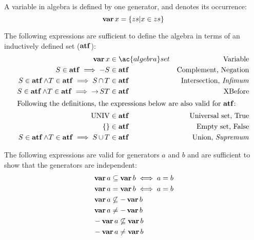\documentclass[en,twoside,onehalfspacing,phd]{risethesis}
\def\varop{\ensuremath\operatorname{\mathbf{var}}}
\newcommand{\var}[1]{\ensuremath\varop #1}
\def\xbeforeop{\ensuremath\rightarrow}
\newcommand{\xbefore}[2]{\ensuremath #1 \xbeforeop #2 }
\def\True{\ensuremath\operatorname{UNIV}}
\def\False{\ensuremath\operatorname{\left\{\right\}}}
\def\algebraset{\ensuremath\operatorname{\mathbf{atf}}}
\newcommand{\setsin}[1]{\ensuremath\left\{ #1 \right\}}
\def\union{\ensuremath\operatorname{\cup}}
\def\inter{\ensuremath\operatorname{\cap}}
\def\xbefore{\ensuremath\operatorname{\rightarrow}}
\begin{document}
A variable in \ac{algebra} is defined by one generator, and denotes its occurrence:
%
\begin{equation}
\label{def:var}
\var{x} =
  \setsin{
    zs | x \in zs
  }
\end{equation}

The following expressions are sufficient to define the \ac{algebra} in terms of an inductively defined set ($\algebraset$):
%
\begin{subequations}
\label{def:algebraset}
\begin{align}
\var x & \in \ac{algebra}set & \text{Variable}\label{def:algebraset-var}\\
S \in \algebraset \implies -S & \in \algebraset & \text{Complement, Negation}\label{def:algebraset-compl}\\
S \in \algebraset \land T \in \algebraset \implies S \inter T & \in \algebraset & \text{Intersection, \emph{Infimum}}\label{def:algebraset-inf}\\
S \in \algebraset \land T \in \algebraset \implies \xbefore{S}{T} & \in \algebraset & \text{XBefore}\label{def:algebraset-xbefore}\\
\intertext{Following the definitions, the expressions below are also valid for $\algebraset$:}
\True &\in \algebraset & \text{Universal set, True}\label{def:algebraset-true}\\
\False &\in \algebraset & \text{Empty set, False}\label{def:algebraset-false}\\
S \in \algebraset \land T \in \algebraset \implies S \union T &\in \algebraset & \text{Union, \emph{Supremum}}\label{def:algebraset-sup}
\end{align}
\end{subequations}

The following expressions are valid for generators $a$ and $b$ and are sufficient to show that the generators are independent:
%
\begin{subequations}
\label{eqs:generators-independence}
\begin{align}
&\var a \subseteq \var b \iff a = b\label{eqs:generators-independence-subseteq-eq}\\
&\var a = \var b \iff a = b\\
&\var a \not\subseteq - \var b\\
&\var a \neq -\var b\label{eqs:generators-independence-subseteq-neq-compl} \\
&- \var a \not\subseteq \var b\\
&- \var a \neq \var b\label{eqs:generators-independence-subseteq-compl-neq}
\end{align}
\end{subequations}
\end{document}
